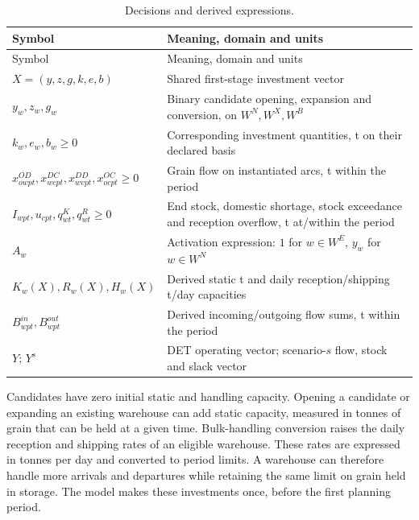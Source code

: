 \documentclass[
  english,
  11pt,
  a4paper,
  authoryear,
  preprint]{elsarticle}
\begin{document}
\begin{longtable}[]{@{}
  >{\raggedright\arraybackslash}p{}
  >{\raggedright\arraybackslash}p{}@{}}
\caption{Decisions and derived
expressions.}\label{tbl-variables}\tabularnewline
\toprule\noalign{}
\begin{minipage}[b]{\linewidth}\raggedright
Symbol
\end{minipage} & \begin{minipage}[b]{\linewidth}\raggedright
Meaning, domain and units
\end{minipage} \\
\midrule\noalign{}
\endfirsthead
\toprule\noalign{}
\begin{minipage}[b]{\linewidth}\raggedright
Symbol
\end{minipage} & \begin{minipage}[b]{\linewidth}\raggedright
Meaning, domain and units
\end{minipage} \\
\midrule\noalign{}
\endhead
\bottomrule\noalign{}
\endlastfoot
\(X=(y,z,g,k,e,b)\) & Shared first-stage investment vector \\
\(y_w,z_w,g_w\) & Binary candidate opening, expansion and conversion, on
\(W^N,W^X,W^B\) \\
\(k_w,e_w,b_w\ge0\) & Corresponding investment quantities, t on their
declared basis \\
\(x^{OD}_{owpt},x^{DC}_{wcpt},x^{DD}_{wvpt},x^{OC}_{ocpt}\ge0\) & Grain
flow on instantiated arcs, t within the period \\
\(I_{wpt},u_{cpt},q^K_{wt},q^R_{wt}\ge0\) & End stock, domestic
shortage, stock exceedance and reception overflow, t at/within the
period \\
\(A_w\) & Activation expression: \(1\) for \(w\in W^E\), \(y_w\) for
\(w\in W^N\) \\
\(K_w(X),R_w(X),H_w(X)\) & Derived static t and daily reception/shipping
t/day capacities \\
\(B^{in}_{wpt},B^{out}_{wpt}\) & Derived incoming/outgoing flow sums, t
within the period \\
\(Y\); \(Y^s\) & DET operating vector; scenario-\(s\) flow, stock and
slack vector \\
\end{longtable}

Candidates have zero initial static and handling capacity. Opening a
candidate or expanding an existing warehouse can add static capacity,
measured in tonnes of grain that can be held at a given time.
Bulk-handling conversion raises the daily reception and shipping rates
of an eligible warehouse. These rates are expressed in tonnes per day
and converted to period limits. A warehouse can therefore handle more
arrivals and departures while retaining the same limit on grain held in
storage. The model makes these investments once, before the first
planning period.
\end{document}
